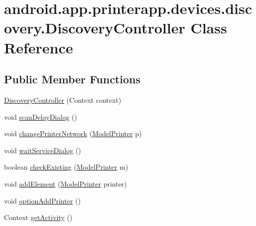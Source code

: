 \hypertarget{classandroid_1_1app_1_1printerapp_1_1devices_1_1discovery_1_1_discovery_controller}{}\section{android.\+app.\+printerapp.\+devices.\+discovery.\+Discovery\+Controller Class Reference}
\label{classandroid_1_1app_1_1printerapp_1_1devices_1_1discovery_1_1_discovery_controller}
\subsection*{Public Member Functions}
\begin{DoxyCompactItemize}
\item 
\hyperlink{classandroid_1_1app_1_1printerapp_1_1devices_1_1discovery_1_1_discovery_controller_a0589e2ad1a92d84f1e766907640484be}{Discovery\+Controller} (Context context)
\item 
void \hyperlink{classandroid_1_1app_1_1printerapp_1_1devices_1_1discovery_1_1_discovery_controller_a82f076d52febed667db1d93e7701d0d8}{scan\+Delay\+Dialog} ()
\item 
void \hyperlink{classandroid_1_1app_1_1printerapp_1_1devices_1_1discovery_1_1_discovery_controller_abd03fec38a539b4082bc708ea700beae}{change\+Printer\+Network} (\hyperlink{classandroid_1_1app_1_1printerapp_1_1model_1_1_model_printer}{Model\+Printer} p)
\item 
void \hyperlink{classandroid_1_1app_1_1printerapp_1_1devices_1_1discovery_1_1_discovery_controller_a8ac113aa3f85eb570f28086e093c45d5}{wait\+Service\+Dialog} ()
\item 
boolean \hyperlink{classandroid_1_1app_1_1printerapp_1_1devices_1_1discovery_1_1_discovery_controller_ac794c1d86ed3f2b53d86f38a07134933}{check\+Existing} (\hyperlink{classandroid_1_1app_1_1printerapp_1_1model_1_1_model_printer}{Model\+Printer} m)
\item 
void \hyperlink{classandroid_1_1app_1_1printerapp_1_1devices_1_1discovery_1_1_discovery_controller_a4f8e094f4082bc0dea247401e12f5dc2}{add\+Element} (\hyperlink{classandroid_1_1app_1_1printerapp_1_1model_1_1_model_printer}{Model\+Printer} printer)
\item 
void \hyperlink{classandroid_1_1app_1_1printerapp_1_1devices_1_1discovery_1_1_discovery_controller_acac9b8e3bce9725ba6481d9f248b4343}{option\+Add\+Printer} ()
\item 
Context \hyperlink{classandroid_1_1app_1_1printerapp_1_1devices_1_1discovery_1_1_discovery_controller_a154107f13a9265621ff65a0498cdd986}{get\+Activity} ()
\end{DoxyCompactItemize}



